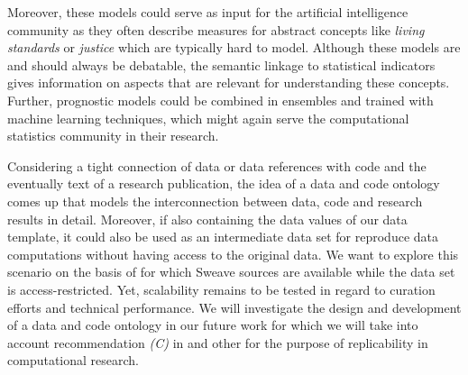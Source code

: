 \documentclass{acm_proc_article-sp}
\begin{document}
Moreover, these models could serve as input for the artificial intelligence community as they often describe measures for abstract concepts like \textit{living standards} or \textit{justice} which are typically hard to model.
Although these models are and should always be debatable, the semantic linkage to statistical indicators gives information on aspects that are relevant for understanding these concepts.
Further, prognostic models could be combined in ensembles and trained with machine learning techniques, which might again serve the computational statistics community in their research.


Considering a tight connection of data or data references with code and the eventually text of a research publication, the idea of a data and code ontology comes up that models the interconnection between data, code and research results in detail. 
Moreover, if also containing the data values of our data template, it could also be used as an intermediate data set for reproduce data computations without having access to the original data.
We want to explore this scenario on the basis of \cite{arai2011fragile} for which Sweave sources are available while the data set is access-restricted.
Yet, scalability remains to be tested in regard to curation efforts and technical performance.
We will investigate the design and development of a data and code ontology in our future work for which we will take into account recommendation \textit{(C)} in \cite{RePEc_ejw_journl_v_4_y_2007_i_3_p_326_337} and other
%
%
\cite{KoenkerZeileis2009} 
%
\cite{baiocchi2007reproducible}
%
\cite{gentleman2007statistical}
%
\cite{rahmandad2012reporting}
for the purpose of replicability in computational research.


%
%
%



%
%
%
%
%
%
%









\balancecolumns






 
\end{document}
